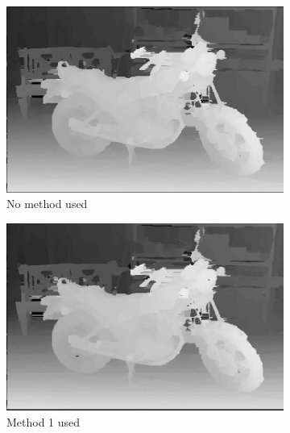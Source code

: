\begin{figure}[!ht]
  \centering
  \begin{subfigure}[t]{0.3\textwidth}
    \centering\includegraphics[width=\textwidth]{figures/mot_eepsm1}
    \caption{No method used \label{fig:memmetnone}}
  \end{subfigure}\hspace{0.5cm}
  \begin{subfigure}[t]{0.3\textwidth}
    \centering\includegraphics[width=\textwidth]{figures/mot_eepsm_div}
    \caption{Method 1 used\label{fig:memmetdiv}}
  \end{subfigure}\hspace{0.5cm}
  \begin{subfigure}[t]{0.3\textwidth}

\end{subfigure}
\end{figure}
